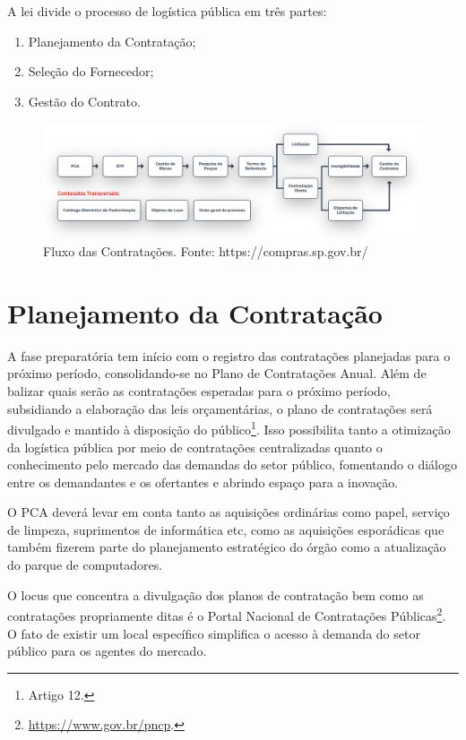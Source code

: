 A lei divide o processo de logística pública em três partes:
\begin{enumerate}
    \item{Planejamento da Contratação;}
    \item{Seleção do Fornecedor;}
    \item{Gestão do Contrato.}
\end{enumerate}

\begin{figure}
    \centering
    \includegraphics[scale=0.26]{conteudo/imagens/fluxo.png}
    \caption{Fluxo das Contratações. Fonte: https://compras.sp.gov.br/}
    \label{fig:fluxo}
\end{figure}

\section{Planejamento da Contratação}

A fase preparatória tem início com o registro das contratações planejadas para o próximo período, consolidando-se no Plano de Contratações Anual. Além de balizar quais serão as contratações esperadas para o próximo período, subsidiando a elaboração das leis orçamentárias, o plano de contratações será divulgado e mantido à disposição do público\footnote{Artigo 12.}. Isso possibilita tanto a otimização da logística pública por meio de contratações centralizadas quanto o conhecimento pelo mercado das demandas do setor público, fomentando o diálogo entre os demandantes e os ofertantes e abrindo espaço para a inovação.

O PCA deverá levar em conta tanto as aquisições ordinárias como papel, serviço de limpeza, suprimentos de informática etc, como as aquisições esporádicas que também fizerem parte do planejamento estratégico do órgão como a atualização do parque de computadores. \citet{TCE2022}

O locus que concentra a divulgação dos planos de contratação bem como as contratações propriamente ditas é o Portal Nacional de Contratações Públicas\footnote{\url{https://www.gov.br/pncp}.}. O fato de existir um local específico simplifica o acesso à demanda do setor público para os agentes do mercado.

